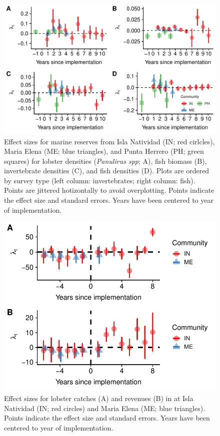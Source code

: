 \documentclass{frontiersSCNS}
\begin{document}
\begin{figure}
\centering
\includegraphics{Villasenor-Derbez_files/figure-latex/unnamed-chunk-8-1.pdf}
\caption{\label{fig:unnamed-chunk-8}\label{fig:indicators}Effect sizes for
marine reserves from Isla Natividad (IN; red cirlcles), Maria Elena (ME;
blue triangles), and Punta Herrero (PH; green squares) for lobster
densities (\emph{Panulirus spp}; A), fish biomass (B), invertebrate
densities (C), and fish densities (D). Plots are ordered by survey type
(left column: invertebrates; right column: fish). Points are jittered
hotizontally to avoid overplotting. Points indicate the effect size and
standard errors. Years have been centered to year of implementation.}
\end{figure}

\begin{figure}
\centering
\includegraphics{Villasenor-Derbez_files/figure-latex/unnamed-chunk-9-1.pdf}
\caption{\label{fig:unnamed-chunk-9}\label{fig:lobsters}Effect sizes for
lobster catches (A) and revenues (B) in at Isla Natividad (IN; red
circles) and Maria Elena (ME; blue triangles). Points indicate the
effect size and standard errors. Years have been centered to year of
implementation.}
\end{figure}
\end{document}
